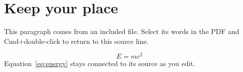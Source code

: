 \section{Keep your place}
This paragraph comes from an included file. Select its words in the PDF
and Cmd+double-click to return to this source line.

\begin{equation}\label{eq:energy}
  E = mc^2
\end{equation}
Equation~\ref{eq:energy} stays connected to its source as you edit.
